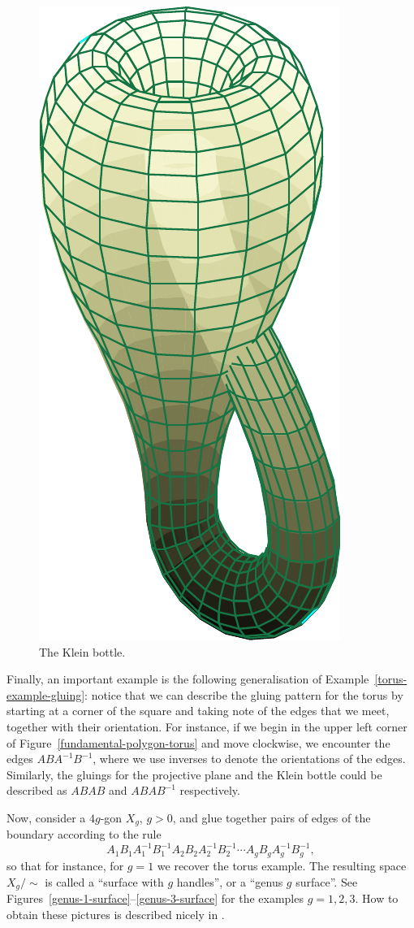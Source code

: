 \begin{figure}
\begin{minipage}{.45\textwidth}
\end{minipage}
\begin{minipage}{.45\textwidth}
  \centering
  \includegraphics[width=.4\linewidth]{images/figure-klein}
  \caption{The Klein bottle.}
  \label{figure-klein}
\end{minipage}
\end{figure}
\begin{example}
  \label{surface-example}
  Finally, an important example is the following generalisation of Example~\ref{torus-example-gluing}: notice that we can describe the gluing pattern for the torus by starting at a corner of the square and taking note of the edges that we meet, together with their orientation. For instance, if we begin in the upper left corner of Figure~\ref{fundamental-polygon-torus} and move clockwise, we encounter the edges $ABA^{-1}B^{-1}$, where we use inverses to denote the orientations of the edges. Similarly, the gluings for the projective plane and the Klein bottle could be described as $ABAB$ and $ABAB^{-1}$ respectively.
  
  Now, consider a $4g$-gon $X_g$, $g > 0$, and glue together pairs of edges of the boundary according to the rule
  \[
    A_1 B_1 A_1^{-1} B_1^{-1} A_2 B_2 A_2^{-1} B_2^{-1} \cdots A_g B_g A_g^{-1} B_g^{-1},
  \]
  so that for instance, for $g = 1$ we recover the torus example. The resulting space $X_g / \!\sim$ is called a ``surface with $g$ handles'', or a ``genus $g$ surface''. See Figures~\ref{genus-1-surface}--\ref{genus-3-surface} for the examples $g = 1, 2, 3$. How to obtain these pictures is described nicely in \cite[Sect.~3.3]{Fje}.
\end{example}
